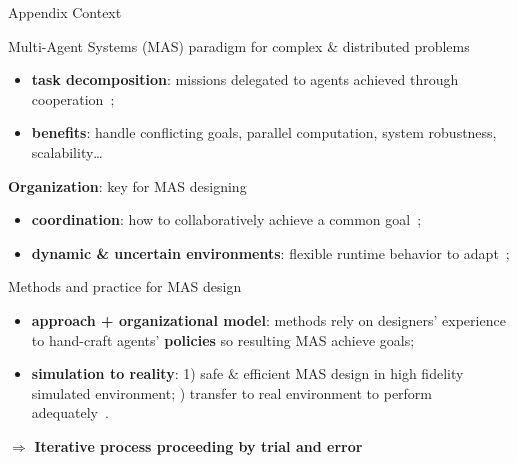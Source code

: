 \begin{frame}{Appendix}
    {Context}

    \begin{block}{Multi-Agent Systems (MAS) paradigm for complex \& distributed problems}
        \begin{itemize}
            \item \textbf{task decomposition}: missions delegated to agents achieved through cooperation~\parencite{Raileanu2023};
            \item \textbf{benefits}: handle conflicting goals, parallel computation, system robustness, scalability\dots
        \end{itemize}
    \end{block}

    \begin{block}{\textbf{Organization}: key for MAS designing}
        \begin{itemize}
            \item \textbf{coordination}: how to collaboratively achieve a common goal~\parencite{Hubner2007};
            \item \textbf{dynamic \& uncertain environments}: flexible runtime behavior to adapt~\parencite{Kathleen2020};
        \end{itemize}
    \end{block}

    \begin{block}{Methods and practice for MAS design}
        \begin{itemize}
            \item \textbf{approach + organizational model}: methods rely on designers' experience to hand-craft agents' \textbf{policies} so resulting MAS achieve goals;
            \item \textbf{simulation to reality}: 1) safe \& efficient MAS design in high fidelity simulated environment; ) transfer to real environment to perform adequately~\parencite{Schon2021}.
        \end{itemize}
        \quad $\Longrightarrow$ \textbf{Iterative process proceeding by trial and error}

    \end{block}

\end{frame}


